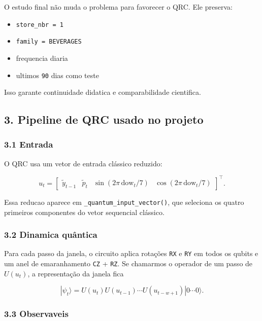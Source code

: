 \documentclass[12pt]{article}
\providecommand{\tightlist}{%
          \setlength{\itemsep}{0pt}\setlength{\parskip}{0pt}}
\begin{document}
O estudo final não muda o problema para favorecer o QRC. Ele preserva:

\begin{itemize}
\tightlist
\item
  \texttt{store\_nbr\ =\ 1}
\item
  \texttt{family\ =\ BEVERAGES}
\item
  frequencia diaria
\item
  ultimos \texttt{90} dias como teste
\end{itemize}

Isso garante continuidade didatica e comparabilidade cientifica.

\subsection{3. Pipeline de QRC usado no projeto}\label{3-pipeline-de-qrc-usado-no-projeto}

\subsubsection{3.1 Entrada}\label{31-entrada}

O QRC usa um vetor de entrada clássico reduzido:

\[
u_t =
\begin{bmatrix}
\widetilde{y}_{t-1} &
\widetilde{p}_t &
\sin(2\pi \, \mathrm{dow}_t / 7) &
\cos(2\pi \, \mathrm{dow}_t / 7)
\end{bmatrix}^\top.
\]

Essa reducao aparece em \texttt{\_quantum\_input\_vector()}, que seleciona os quatro primeiros componentes do vetor sequencial clássico.

\subsubsection{3.2 Dinamica quântica}\label{32-dinamica-quuxe2ntica}

Para cada passo da janela, o circuito aplica rotações \texttt{RX} e \texttt{RY} em todos os qubits e um anel de emaranhamento \texttt{CZ} + \texttt{RZ}. Se chamarmos o operador de um passo de \(U(u_t)\), a representação da janela fica

\[
|\psi_t\rangle = U(u_t) U(u_{t-1}) \cdots U(u_{t-w+1}) |0 \cdots 0\rangle.
\]

\subsubsection{3.3 Observaveis}\label{33-observaveis}
\end{document}
